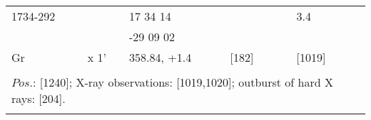 \documentclass{aa}
\begin{document}
\begin{tabular}{p{2.5cm}p{1cm}p{1.8cm}p{2.3cm}p{3.3cm}p{2.0cm}p{2.2cm}}
\noalign{\smallskip}
1734-292        &                   & 17 34 14              &                    &                         & 3.4                &       \\
                         &                   & -29 09 02             &                    &                         &                       &      \\
Gr                    & x 1'            & 358.84, +1.4        & [182]         &                         & [1019]           &   \\
\\
\multicolumn{7}{p{17.5cm}}{
$Pos$.: [1240]; X-ray observations: [1019,1020]; outburst of hard X rays: [204].}\\
\noalign{\smallskip}
\hline

\end{tabular}
\end{document}
